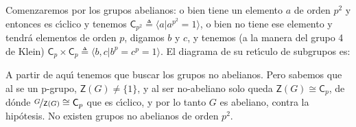 \documentclass[final,12pt,a4paper,twoside,fleqn]{extbook}
\newcommand{\grclass}[1]{\ensuremath{\mathsf{#1}}}
\newcommand{\cyclicgr}[1]{\ensuremath{{\grclass{C}}_{#1}}}
\theoremstyle{definition}
\theoremstyle{remark}
\begin{document}
Comenzaremos por los grupos abelianos: o bien tiene un elemento $a$ de orden $p^2$ y entonces es c{\'{\i}}clico y tenemos $\cyclicgr{p^2}\triangleq\langle{a\vert a^{p^2}=1}\rangle$, o bien no tiene ese elemento y tendr\'a elementos de orden $p$, digamos $b$ y $c$, y tenemos (a la manera del grupo 4 de Klein) $\cyclicgr{p}                  \times                  \cyclicgr{p}\triangleq\langle{b,c\vert b^{p}=c^{p}=1}\rangle$. El diagrama de su ret{\'{\i}}culo de subgrupos es:






\begin{center}
\end{center}


A partir de aqu{\'{\i}} tenemos que buscar los grupos no abelianos. Pero sabemos que al se un p-grupo, $\mathsf{Z}\left(G\right)                  \neq                  \{1\}$, y al ser no-abeliano solo queda $\mathsf{Z}\left(G\right)                  \cong                  \cyclicgr{p}$,
de d\'onde $\nicefrac{G}{\mathsf{Z}\left(G\right)}                   \cong                   \cyclicgr{p}$ que es c{\'{\i}}clico, y por lo tanto $G$ es abeliano, contra la hip\'otesis. No existen grupos no abelianos de orden $p^2$.
\end{document}
